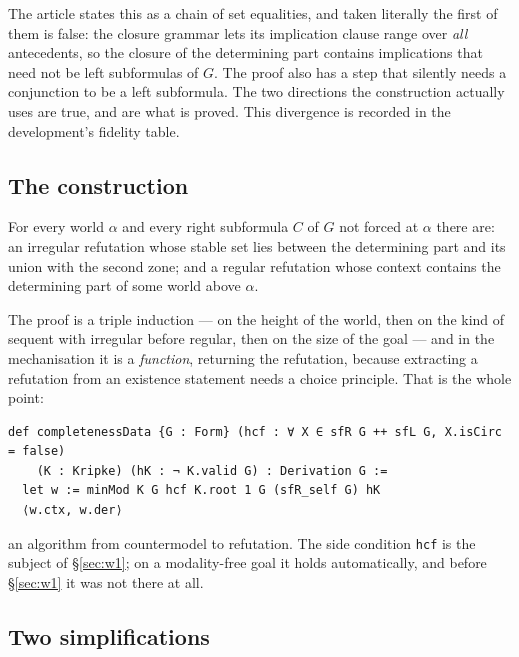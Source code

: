 \documentclass[11pt,a4paper]{article}
\begin{document}
\begin{remark}
The article states this as a chain of set equalities, and taken literally
the first of them is false: the closure grammar lets its implication
clause range over \emph{all} antecedents, so the closure of the
determining part contains implications that need not be left subformulas
of $G$. The proof also has a step that silently needs a conjunction to be
a left subformula. The two directions the construction actually uses are
true, and are what is proved. This divergence is recorded in the
development's fidelity table.
\end{remark}

\subsection{The construction}

\begin{lemma}[Lemma 6.3]
\label{lem:minmod}
For every world $\alpha$ and every right subformula $C$ of $G$ not forced
at $\alpha$ there are: an irregular refutation whose stable set lies
between the determining part and its union with the second zone; and a
regular refutation whose context contains the determining part of some
world above $\alpha$.
\end{lemma}

The proof is a triple induction --- on the height of the world, then on
the kind of sequent with irregular before regular, then on the size of the
goal --- and in the mechanisation it is a \emph{function}, returning the
refutation, because extracting a refutation from an existence statement
needs a choice principle. That is the whole point:

\begin{lstlisting}
def completenessData {G : Form} (hcf : ∀ X ∈ sfR G ++ sfL G, X.isCirc = false)
    (K : Kripke) (hK : ¬ K.valid G) : Derivation G :=
  let w := minMod K G hcf K.root 1 G (sfR_self G) hK
  ⟨w.ctx, w.der⟩
\end{lstlisting}

\noindent
an algorithm from countermodel to refutation. The side condition
\texttt{hcf} is the subject of \S\ref{sec:w1}; on a modality-free goal it
holds automatically, and before \S\ref{sec:w1} it was not there at all.

\subsection{Two simplifications}
\end{document}
